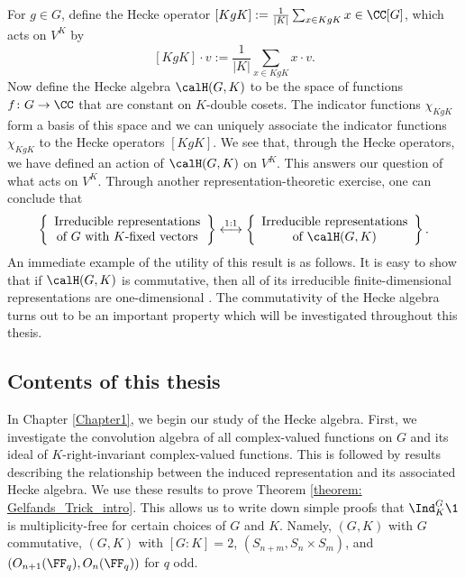 \documentclass[11pt]{amsart}
\theoremstyle{remark}
\begin{document}
For $g\in G$, define the Hecke operator $[KgK] := \frac{1}{|K|}\sum_{x\in KgK} x\in\CC[G]$, which acts on $V^K$ by
\[
	[KgK]\cdot v := \frac{1}{|K|}\sum_{x\in KgK} x\cdot v.
\]
Now define the Hecke algebra $\calH(G,K)$ to be the space of functions $f\colon G\to\CC$ that are constant on $K$-double cosets.
The indicator functions $\chi_{KgK}$ form a basis of this space and we can uniquely associate the indicator functions $\chi_{KgK}$ to the Hecke operators $[KgK]$.
We see that, through the Hecke operators, we have defined an action of $\calH(G,K)$ on $V^K$.
This answers our question of what acts on $V^K$.
Through another representation-theoretic exercise, one can conclude that
\[
	\left\{\begin{array}{c}
		\text{Irreducible representations} \\
		\text{of $G$ with $K$-fixed vectors}
	\end{array}\right\}
	\stackrel{1:1}{\longleftrightarrow}
	\left\{\begin{array}{c}
		\text{Irreducible representations} \\
		\text{of $\calH(G,K)$}
	\end{array}\right\}.
\]
An immediate example of the utility of this result is as follows. It is easy to show that if $\calH(G,K)$ is commutative, then all of its irreducible finite-dimensional representations are one-dimensional \cite{Etingof11}.
The commutativity of the Hecke algebra turns out to be an important property which will be investigated throughout this thesis.


\subsection*{Contents of this thesis}
In Chapter \ref{Chapter1}, we begin our study of the Hecke algebra.
First, we investigate the convolution algebra of all complex-valued functions on $G$ and its ideal of $K$-right-invariant complex-valued functions.
This is followed by results describing the relationship between the induced representation and its associated Hecke algebra.
We use these results to prove Theorem \ref{theorem: Gelfands_Trick_intro}.
This allows us to write down simple proofs that $\Ind_K^G \1$ is multiplicity-free for certain choices of $G$ and $K$.
Namely, $(G,K)$ with $G$ commutative, $(G,K)$ with $[G\! :\! K]=2$, $(S_{n+m}, S_n\times S_m)$, and $(O_{n+1}(\FF_q), O_n(\FF_q))$ for $q$ odd.
\end{document}
